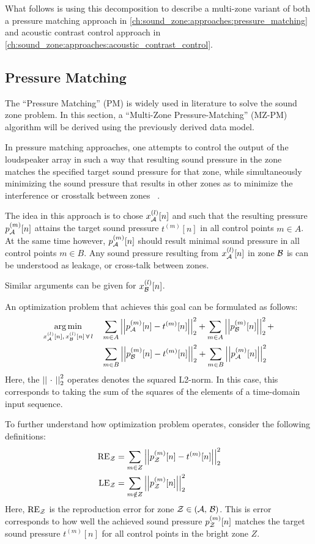 What follows is using this decomposition to describe a multi-zone variant of both a pressure matching approach 
in \autoref{ch:sound_zone:approaches:pressure_matching}
and acoustic contrast control approach in \autoref{ch:sound_zone:approaches:acoustic_contrast_control}.

\subsection{Pressure Matching}
\label{ch:sound_zone:approaches:pressure_matching}
The ``Pressure Matching'' (PM) is widely used in literature to solve the sound zone problem.
In this section, a ``Multi-Zone Pressure-Matching'' (MZ-PM) algorithm will be derived using the previously derived data model.

In pressure matching approaches, one attempts to control the output of the loudspeaker array in such a way that resulting sound pressure in the zone 
matches the specified target sound pressure for that zone, 
while simultaneously minimizing the sound pressure that results in other zones as to minimize the interference or crosstalk between zones
~\cite{betlehem2015personal, olik2013comparative}.

The idea in this approach is to chose $x_{\mathcal{A}}^{(l)}[n]$ and such that the resulting pressure 
$p_{\mathcal{A}}^{(m)}[n]$ attains the target sound pressure $t^{(m)}[n]$ in all control points $m \in A$.   
At the same time however, $p_{\mathcal{A}}^{(m)}[n]$ should result minimal sound pressure in all control points $m \in B$.
Any sound pressure resulting from $x_{\mathcal{A}}^{(l)}[n]$ in zone $\mathcal{B}$ is can be understood as leakage, or cross-talk between zones. 

Similar arguments can be given for $x_{\mathcal{B}}^{(l)}[n]$.

An optimization problem that achieves this goal can be formulated as follows:
\begin{align}
    \argmin{x_\za^{(l)}[n],\,x_\zb^{(l)}[n]\,\forall\,l}{
       &\sum_{m\in A} \norm[2][2]{p_\za^{(m)}[n] - t^{(m)}[n]} +
        \sum_{m\in A} \norm[2][2]{p_\zb^{(m)}[n]} + \\
       &\sum_{m\in B} \norm[2][2]{p_\zb^{(m)}[n] - t^{(m)}[n]} + 
        \sum_{m\in B} \norm[2][2]{p_\za^{(m)}[n]}
    }
\end{align}
Here, the $\norm[2][2]{\,\,\cdot\,\,}$ operates denotes the squared L2-norm. 
In this case, this corresponds to taking the sum of the squares of the elements of a time-domain input sequence.

To further understand how optimization problem operates, consider the following definitions: 
\begin{align}
    \text{RE}_\zz &= \sum_{m\in Z} \norm[2][2]{p_\zz^{(m)}[n] - t^{(m)}[n]} \\
    \text{LE}_\zz &= \sum_{m\notin Z} \norm[2][2]{p_\zz^{(m)}[n]} 
\end{align}
Here, $\text{RE}_{\mathcal{Z}}$ is the reproduction error for zone $\mathcal{Z} \in \left(\mathcal{A},\,\mathcal{B}\right)$.
This is error corresponds to how well the achieved sound pressure $p_{\mathcal{Z}}^{(m)}[n]$ matches the target sound pressure $t^{(m)}[n]$ for all control points in the
bright zone $Z$. 


